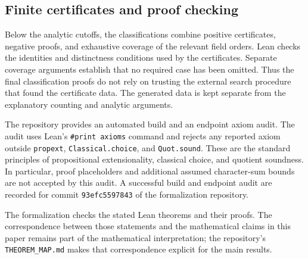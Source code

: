 \documentclass{article}
\theoremstyle{definition}
\numberwithin{equation}{section}
\begin{document}
\subsection{Finite certificates and proof checking}

Below the analytic cutoffs, the classifications combine positive
certificates, negative proofs, and exhaustive coverage of the relevant
field orders. Lean checks the identities and distinctness conditions used
by the certificates. Separate coverage arguments establish that no required
case has been omitted. Thus the final classification proofs do not rely
on trusting the external search procedure that found the certificate data.
The generated data is kept separate from the explanatory counting and
analytic arguments.

The repository provides an automated build and an endpoint axiom audit.
The audit uses Lean's \texttt{\#print axioms} command and rejects any reported
axiom outside \texttt{propext}, \texttt{Classical.choice}, and
\texttt{Quot.sound}. These are the standard principles of propositional
extensionality, classical choice, and quotient soundness. In particular,
proof placeholders and additional assumed character-sum bounds are not
accepted by this audit. A successful build and endpoint audit are recorded
for commit \texttt{93efc5597843} of the formalization repository.

The formalization checks the stated Lean theorems and their proofs. The
correspondence between those statements and the mathematical claims in this
paper remains part of the mathematical interpretation; the repository's
\texttt{THEOREM\_MAP.md} makes that correspondence explicit for the main
results.



\end{document}
